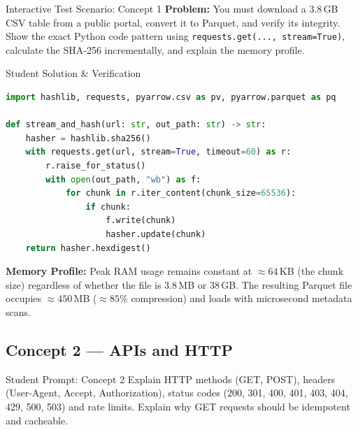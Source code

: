 \documentclass[11pt,a4paper]{article}
\begin{document}
\begin{testbox}{Interactive Test Scenario: Concept 1}
\textbf{Problem:} You must download a 3.8\,GB CSV table from a public portal, convert it to Parquet, and verify its integrity. Show the exact Python code pattern using \texttt{requests.get(..., stream=True)}, calculate the SHA-256 incrementally, and explain the memory profile.
\end{testbox}

\begin{evalbox}{Student Solution \& Verification}
\begin{lstlisting}[language=Python]
import hashlib, requests, pyarrow.csv as pv, pyarrow.parquet as pq

def stream_and_hash(url: str, out_path: str) -> str:
    hasher = hashlib.sha256()
    with requests.get(url, stream=True, timeout=60) as r:
        r.raise_for_status()
        with open(out_path, "wb") as f:
            for chunk in r.iter_content(chunk_size=65536):
                if chunk:
                    f.write(chunk)
                    hasher.update(chunk)
    return hasher.hexdigest()
\end{lstlisting}
\textbf{Memory Profile:} Peak RAM usage remains constant at $\approx 64$\,KB (the chunk size) regardless of whether the file is 3.8\,MB or 38\,GB. The resulting Parquet file occupies $\approx 450$\,MB ($\approx 85\%$ compression) and loads with microsecond metadata scans.
\end{evalbox}

\subsection{Concept 2 --- APIs and HTTP}
\begin{promptbox}{Student Prompt: Concept 2}
Explain HTTP methods (GET, POST), headers (User-Agent, Accept, Authorization), status codes (200, 301, 400, 401, 403, 404, 429, 500, 503) and rate limits. Explain why GET requests should be idempotent and cacheable.
\end{promptbox}
\end{document}
